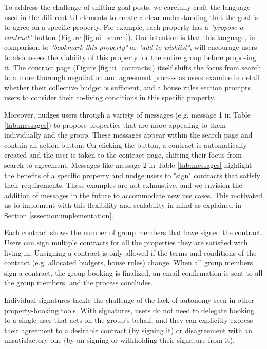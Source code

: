 To address the challenge of shifting goal posts, we carefully craft the language used in the different UI elements to create a clear understanding that the goal is to agree on a specific property. For example, each property has a \textit{"propose a contract"} button (Figure \ref{fig:ui_search}). Our intention is that this language, in comparison to \textit{"bookmark this property"} or \textit{"add to wishlist"}, will encourage users to also assess the viability of this property for the entire group before proposing it. The contract page (Figure \ref{fig:ui_contracts}) itself shifts the focus from search to a more thorough negotiation and agreement process as users examine in detail whether their collective budget is sufficient, and a house rules section prompts users to consider their co-living conditions in this specific property.

Moreover, \cbot nudges users through a variety of messages (e.g. message 1 in Table \ref{tab:messages}) to propose properties that are more appealing to them individually and the group. These messages appear within the search page and contain an action button: On clicking the button, a contract is automatically created and the user is taken to the contract page, shifting their focus from search to agreement. Messages like message 2 in Table \ref{tab:messages} highlight the benefits of a specific property and nudge users to "sign" contracts that satisfy their requirements. These examples are not exhaustive, and we envision the addition of \cbot messages in the future to accommodate new use cases. This motivated us to implement \tool with this flexibility and scalability in mind as explained in Section \ref{sssection:implementation}.


Each contract shows the number of group members that have signed the contract. Users can sign multiple contracts for all the properties they are satisfied with living in. Unsigning a contract is only allowed if the terms and conditions of the contract (e.g. allocated budgets, house rules) change. When all group members sign a contract, the group booking is finalized, an email confirmation is sent to all the group members, and the process concludes. 

Individual signatures tackle the challenge of the lack of autonomy seen in other property-booking tools. With signatures, users do not need to delegate booking to a single user that acts on the group's behalf, and they can explicitly express their agreement to a desirable contract (by signing it) or disagreement with an unsatisfactory one (by un-signing or withholding their signature from it).

